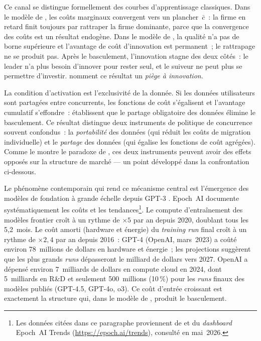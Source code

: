 Ce canal se distingue formellement des courbes d'apprentissage classiques. Dans le modèle de \textcite{cabral_learning_1994}, les coûts marginaux convergent vers un plancher~$\bar{c}$~: la firme en retard finit toujours par rattraper la firme dominante, parce que la convergence des coûts est un résultat endogène. Dans le modèle de \textcite{pruefer_competing_2021}, la qualité n'a pas de borne supérieure et l'avantage de coût d'innovation est permanent~; le rattrapage ne se produit pas. Après le basculement, l'innovation stagne des deux côtés~: le leader n'a plus besoin d'innover pour rester seul, et le suiveur ne peut plus se permettre d'investir. \textcite{pruefer_competing_2021} nomment ce résultat un \emph{piège à innovation}.

La condition d'activation est l'exclusivité de la donnée. Si les données utilisateurs sont partagées entre concurrents, les fonctions de coût s'égalisent et l'avantage cumulatif s'effondre~: \textcite{pruefer_competing_2021} établissent que le partage obligatoire des données élimine le basculement. Ce résultat distingue deux instruments de politique de concurrence souvent confondus~: la \emph{portabilité} des données (qui réduit les coûts de migration individuelle) et le \emph{partage} des données (qui égalise les fonctions de coût agrégées). Comme le montre le paradoxe de \textcite{giovannetti_platform_2023}, ces deux instruments peuvent avoir des effets opposés sur la structure de marché --- un point développé dans la confrontation ci-dessous.

Le phénomène contemporain qui rend ce mécanisme central est l'émergence des modèles de fondation à grande échelle depuis GPT-3 \parencite{brown_language_2020}. Epoch~AI documente systématiquement les coûts et les tendances\footnote{Les données citées dans ce paragraphe proviennent de \textcite{cottier_rising_2024} et du \emph{dashboard} Epoch~AI Trends (\url{https://epoch.ai/trends}), consulté en mai~2026.}. Le compute d'entraînement des modèles frontier croît à un rythme de $\times 5$ par an depuis 2020, doublant tous les 5,2~mois. Le coût amorti (hardware et énergie) du \emph{training run} final croît à un rythme de $\times 2{,}4$ par an depuis 2016~: GPT-4 (OpenAI, mars~2023) a coûté environ 78~millions de dollars en hardware et énergie~; les projections suggèrent que les plus grands \emph{runs} dépasseront le milliard de dollars vers 2027. OpenAI a dépensé environ 7~milliards de dollars en compute cloud en 2024, dont 5~milliards en R\&D et seulement 500~millions (10\,\%) pour les \emph{runs} finaux des modèles publiés (GPT-4.5, GPT-4o, o3). Ce coût d'entrée croissant est exactement la structure qui, dans le modèle de \textcite{pruefer_competing_2021}, produit le basculement.


